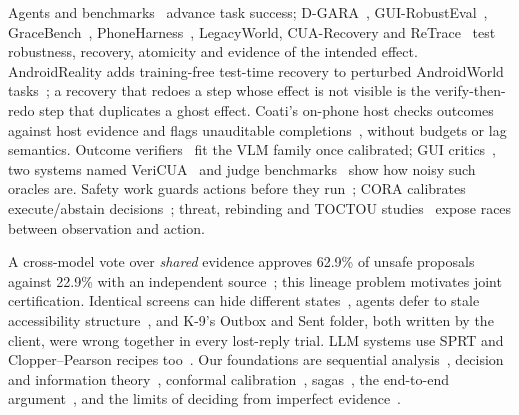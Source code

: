 Agents and benchmarks~\cite{rawles2025androidworld,rawles2023aitw,wen2024autodroid,zhang2025appagent,wang2024mobileagent,ye2025mobileagentv3,qin2025uitars,tian2025agentprog}
advance task success; D-GARA~\cite{chen2025dgara}, GUI-RobustEval~\cite{bu2026recovering}, GraceBench~\cite{zhang2026gracebench}, PhoneHarness~\cite{li2026phoneharness},
LegacyWorld, CUA-Recovery and ReTrace~\cite{reintjes2026legacyworld,hu2026cuarecovery,bang2026lostinrecovery} test robustness, recovery, atomicity and evidence of the intended
effect. AndroidReality adds training-free test-time recovery to perturbed AndroidWorld tasks~\cite{liu2026androidreality}; a recovery that redoes a step whose effect is not
visible is the verify-then-redo step that duplicates a ghost effect. Coati's on-phone host checks outcomes against host evidence and flags unauditable completions~\cite{ying2026coati}, without budgets or lag semantics. Outcome verifiers~\cite{zhang2026verigui,zheng2026tsr,yang2026taskvm} fit the VLM family once calibrated; GUI critics~\cite{wu2025osoracle}, two systems named VeriCUA~\cite{sun2026vericua,wang2026vericuaproactive} and judge
benchmarks~\cite{lu2025agentrewardbench,pan2024autonomous,zheng2023judging} show how noisy such oracles are. Safety work guards actions before they run~\cite{lee2025verisafe,sun2025ossentinel,lee2024mobilesafetybench,yu2026seerguard};
CORA calibrates execute/abstain decisions~\cite{feng2026cora}; threat, rebinding and TOCTOU studies~\cite{liu2025mobilethreats,qian2026rebinding,lilienthal2025toctou,jiang2026atomicity,xu2026temporal,he2026cognitive}
expose races between observation and action.

 A cross-model vote over \emph{shared} evidence approves 62.9\% of unsafe proposals against 22.9\% with an independent
source~\cite{zheng2026vpcontrol}; this lineage problem motivates joint certification. Identical screens can hide different states~\cite{liu2026guinotstate}, agents defer
to stale accessibility structure~\cite{zhang2026believe}, and K-9's Outbox and Sent folder, both written by the client, were wrong together in every lost-reply trial. LLM systems use SPRT and Clopper--Pearson recipes too~\cite{morandi2026sequential,lee2025consol,badshah2026judge}. Our foundations are sequential analysis~\cite{wald1945sprt,wald1948optimum,tartakovsky2014sequential,kaufmann2016complexity,chernoff1959sequential,naghshvar2013active},
decision and information theory~\cite{kaelbling1998pomdp,cover2006elements,tsybakov2009nonparametric}, conformal calibration~\cite{vovk2005algorithmic,angelopoulos2021gentle,angelopoulos2024crc},
sagas~\cite{garciamolina1987sagas,chang2025sagallm}, the end-to-end argument~\cite{saltzer1984endtoend}, and the limits of deciding from imperfect
evidence~\cite{akkoyunlu1975constraints,gray1978notes,chandra1996unreliable,fischer1985impossibility}.
